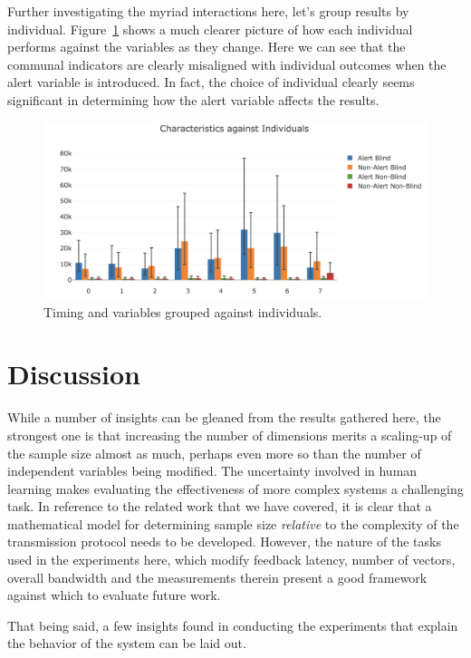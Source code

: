 \documentclass[
12pt, %
oneside, %
english, %
doublespacing, %
headsepline, %
]{MastersDoctoralThesis} %
\begin{document}
Further investigating the myriad interactions here, let's group results by individual. Figure~\ref{fig:p2individuals} shows a much clearer picture of how each individual performs against the variables as they change. Here we can see that the communal indicators are clearly misaligned with individual outcomes when the alert variable is introduced. In fact, the choice of individual clearly seems significant in determining how the alert variable affects the results.

\begin{figure}[h]
	\centering\includegraphics[width=1\linewidth]{images/individuals}
	\decoRule
	\caption[Phase 2 Individual Timing]{Timing and variables grouped against individuals.}
	\label{fig:p2individuals}
\end{figure}

\section{Discussion}

While a number of insights can be gleaned from the results gathered here, the strongest one is that increasing the number of dimensions merits a scaling-up of the sample size almost as much, perhaps even more so than the number of independent variables being modified. The uncertainty involved in human learning makes evaluating the effectiveness of more complex systems a challenging task. In reference to the related work that we have covered, it is clear that a mathematical model for determining sample size \textit{relative} to the complexity of the transmission protocol needs to be developed. However, the nature of the tasks used in the experiments here, which modify feedback latency, number of vectors, overall bandwidth and the measurements therein present a good framework against which to evaluate future work.

That being said, a few insights found in conducting the experiments that explain the behavior of the system can be laid out.
\end{document}
